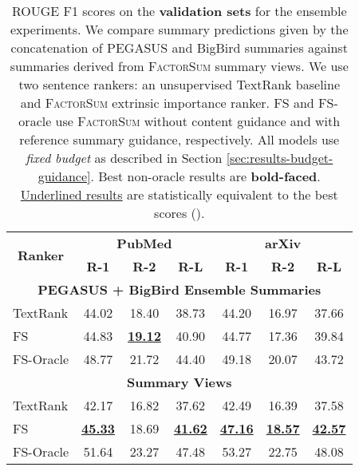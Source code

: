 \documentclass[11pt,table]{article}
\newcommand{\modelname}{FactorSum}
\begin{document}
\begin{table}
  \centering
  \setlength\tabcolsep{1.5pt}
  \begin{tabular}{l|ccc|ccc}
    \toprule
    \multicolumn{1}{c|}{\multirow{2}{1.2cm}{\centering \textbf{Ranker}}} &  \multicolumn{3}{c|}{\textbf{PubMed}} & \multicolumn{3}{c}{\textbf{arXiv}} \\
    \cmidrule(r){2-4} \cmidrule(r){5-7} & \textbf{R-1} & \textbf{R-2} & \textbf{R-L} & \textbf{R-1} & \textbf{R-2} & \textbf{R-L} \\
    \toprule
    \multicolumn{7}{c}{\textbf{PEGASUS + BigBird Ensemble Summaries}} \\
    \midrule
    TextRank & 44.02 & 18.40 & 38.73 & 44.20 & 16.97 & 37.66 \\
    \midrule
    FS & 44.83 & \underline{\textbf{19.12}} & 40.90 & 44.77 & 17.36 & 39.84 \\
    FS-Oracle & 48.77 & 21.72 & 44.40 & 49.18 & 20.07 & 43.72 \\
    \midrule
    \multicolumn{7}{c}{\textbf{Summary Views}} \\
    \midrule
    TextRank & 42.17 & 16.82 & 37.62 & 42.49 & 16.39 & 37.58 \\
    \midrule
    FS & \underline{\textbf{45.33}} & 18.69 & \underline{\textbf{41.62}} & \underline{\textbf{47.16}} & \underline{\textbf{18.57}} & \underline{\textbf{42.57}} \\
    FS-Oracle & 51.64 & 23.27 & 47.48 & 53.27 & 22.75 & 48.08 \\
    \bottomrule
  \end{tabular}
  \caption{ROUGE F1 scores on the \textbf{validation sets} for the ensemble experiments. We compare summary predictions given by the concatenation of PEGASUS and BigBird summaries against summaries derived from \textsc{\modelname} summary views. We use two sentence rankers: an unsupervised TextRank baseline and \textsc{\modelname} extrinsic importance ranker. FS and FS-oracle use \textsc{\modelname} without content guidance and with reference summary guidance, respectively. All models use \emph{fixed budget} as described in Section \ref{sec:results-budget-guidance}. Best non-oracle results are \textbf{bold-faced}. \underline{Underlined results} are statistically equivalent to the best scores ().}\label{tab:ablation_study_validation}
\end{table}
\end{document}
